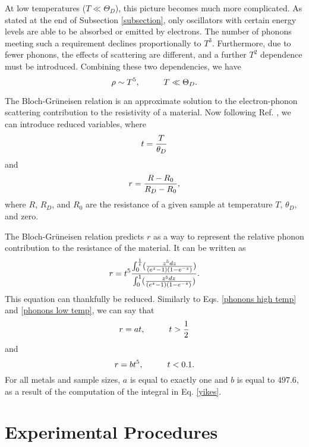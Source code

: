 \documentclass[11pt,letterpaper]{article}
\begin{document}
At low temperatures ($T \ll \Theta_D$), this picture becomes much more complicated. As stated at the end of Subsection \ref{subsection}, only oscillators with certain energy levels are able to be absorbed or emitted by electrons. The number of phonons meeting such a requirement declines proportionally to $T^3$. Furthermore, due to fewer phonons, the effects of scattering are different, and a further $T^2$ dependence must be introduced. Combining these two dependencies, we have
\begin{equation}
    \rho \sim T^5, \hspace{10mm} T \ll \Theta_D. \label{phonons low temp}
\end{equation}

The Bloch-Grüneisen relation is an approximate solution to the electron-phonon scattering contribution to the resistivity of a material. Now following Ref. \cite{Thomas}, we can introduce reduced variables, where 
\begin{equation}
    t = {T \over \theta_D} \label{reducedT}
\end{equation}
and
\begin{equation}
    r = {R - R_0 \over R_D - R_0} , \label{reducedR}
\end{equation}
where $R$, $R_D$, and $R_0$ are the resistance of a given sample at temperature $T$, $\theta_D$, and zero.

The Bloch-Grüneisen relation predicts $r$ as a way to represent the relative phonon contribution to the resistance of the material. It can be written as
\begin{equation}
    r = t^5 {\int_0^{1 \over t} ( {z^5 dz \over (e^z - 1)(1 - e^{-z})}) \over \int_0^1 ( {z^5 dz \over (e^z - 1)(1 - e^{-z})})} . \label{yikes}
\end{equation}
This equation can thankfully be reduced. Similarly to Eqs. \ref{phonons high temp} and \ref{phonons low temp}, we can say that
\begin{equation}
    r = at, \hspace{10mm} t > {1 \over 2}
\end{equation}
and
\begin{equation}
    r = bt^5, \hspace{10mm} t < 0.1 .
\end{equation}
For all metals and sample sizes, $a$ is equal to exactly one and $b$ is equal to $497.6$, as a result of the computation of the integral in Eq. \ref{yikes}.


\section{Experimental Procedures}
\end{document}
